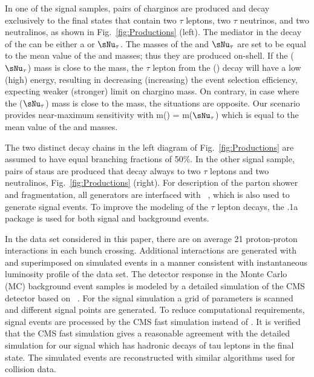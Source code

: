 In one of the signal samples, pairs of charginos are produced and decay exclusively to the final states that contain 
two $\tau$ leptons, two $\tau$ neutrinos, and two neutralinos, as shown in Fig.~\ref{fig:Productions} (left). 
The mediator in the decay of the \chione can be either a \sTau or $\sNu_{\tau}$. 
The masses of the \sTau and $\sNu_{\tau}$ are set to be equal to the mean value of the \chione and \PSGczDo masses; thus they are produced on-shell. 
If the \sTau ($\sNu_{\tau}$) mass is close to the \PSGczDo mass, the $\tau$ lepton from the \sTau (\chione) decay will have a low (high) energy, resulting in decreasing (increasing) the event selection efficiency, expecting weaker (stronger) limit on chargino mass.
On contrary, in case where the \sTau ($\sNu_{\tau}$) mass is close to the \chione mass, the situations are opposite.
Our scenario provides near-maximum sensitivity with m(\sTau) = m($\sNu_{\tau}$) which is equal to the mean value of the \chione and \PSGczDo masses. 

The two distinct decay chains in the left diagram of Fig.~\ref{fig:Productions} 
are assumed to have equal branching fractions of 50\%. 
In the other signal sample, pairs of staus are produced that decay always to two $\tau$ leptons and two neutralinos, Fig.~\ref{fig:Productions} (right). 
For description of the parton shower and fragmentation, all generators are interfaced with ~\cite{Sjostrand:2006za}, 
which is also used to generate signal events. To improve the modeling of the $\tau$ lepton decays, 
 the .1a~\cite{Davidson:2010rw} package is used for both signal and background events. 

In the data set considered in this paper,
there are on average 21 proton-proton interactions in each bunch crossing.
Additional interactions are generated with \PYTHIA and superimposed on simulated events in a manner consistent with 
 instantaneous luminosity profile of the data set.
The detector response in the  Monte Carlo (MC) background event samples is modeled by a
detailed simulation
of the CMS detector based on {\GEANTfour}~\cite{Agostinelli:2002hh}.  
For the signal simulation a grid of parameters is scanned and different signal points are generated. To reduce  computational requirements, signal events 
are processed by the CMS fast simulation \cite{Abdullin:2011zz} instead of {\GEANTfour}. 
It is verified that the CMS fast simulation gives a reasonable agreement with the detailed simulation for our signal which has hadronic decays of 
tau leptons in the final state.
The simulated events are reconstructed with similar algorithms used for collision data.

